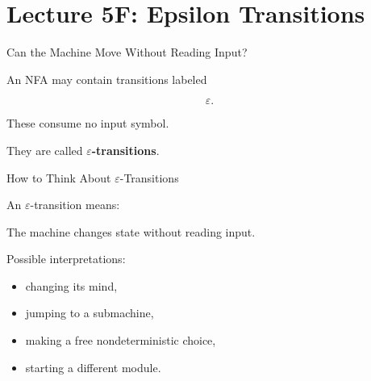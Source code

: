 \documentclass[10pt,aspectratio=169]{beamer}
\newcommand{\eps}{\varepsilon}
\begin{document}
\section{Lecture 5F: Epsilon Transitions}

\begin{frame}{Can the Machine Move Without Reading Input?}

An NFA may contain transitions labeled

\[
\eps.
\]

\vspace{1em}

These consume no input symbol.

\vspace{1em}

They are called \textbf{\(\eps\)-transitions}.

\end{frame}

\begin{frame}{How to Think About \(\eps\)-Transitions}

An \(\eps\)-transition means:

\begin{center}
The machine changes state without reading input.
\end{center}

\vspace{1em}

Possible interpretations:

\begin{itemize}
\item changing its mind,
\item jumping to a submachine,
\item making a free nondeterministic choice,
\item starting a different module.
\end{itemize}

\end{frame}
\end{document}
